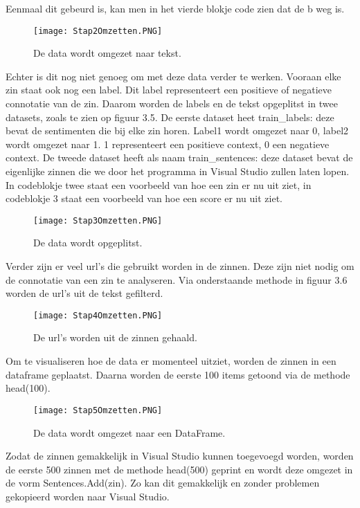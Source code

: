 Eenmaal dit gebeurd is, kan men in het vierde blokje code zien dat de b weg is.

\begin{figure}[!htbp]
    \texttt{[image: Stap2Omzetten.PNG]}
    \caption{\label{stap2amazon}De data wordt omgezet naar tekst.}
\end{figure}
\FloatBarrier

Echter is dit nog niet genoeg om met deze data verder te werken. Vooraan elke zin staat ook nog een label. Dit label representeert een positieve of negatieve connotatie van de zin. Daarom worden de labels en de tekst opgeplitst in twee datasets, zoals te zien op figuur 3.5. De eerste dataset heet train\_labels: deze bevat de sentimenten die bij elke zin horen. Label1 wordt omgezet naar 0, label2 wordt omgezet naar 1. 1 representeert een positieve context, 0 een negatieve context. De tweede dataset heeft als naam train\_sentences: deze dataset bevat de eigenlijke zinnen die we door het programma in Visual Studio zullen laten lopen. In codeblokje twee staat een voorbeeld van hoe een zin er nu uit ziet, in codeblokje 3 staat een voorbeeld van hoe een score er nu uit ziet. 

\begin{figure}[!htbp]
    \texttt{[image: Stap3Omzetten.PNG]}
    \caption{\label{stap3amazon}De data wordt opgeplitst.}
\end{figure}
\FloatBarrier

Verder zijn er veel url's die gebruikt worden in de zinnen. Deze zijn niet nodig om de connotatie van een zin te analyseren. Via onderstaande methode in figuur 3.6 worden de url's uit de tekst gefilterd.

\begin{figure}[!htbp]
    \texttt{[image: Stap4Omzetten.PNG]}
    \caption{\label{stap4amazon}De url's worden uit de zinnen gehaald.}
\end{figure}
\FloatBarrier

Om te visualiseren hoe de data er momenteel uitziet, worden de zinnen in een dataframe geplaatst. Daarna worden de eerste 100 items getoond via de methode head(100).

\begin{figure}[!htbp]
    \texttt{[image: Stap5Omzetten.PNG]}
    \caption{\label{stap5amazon}De data wordt omgezet naar een DataFrame.}
\end{figure}
\FloatBarrier

Zodat de zinnen gemakkelijk in Visual Studio kunnen toegevoegd worden, worden de eerste 500 zinnen met de methode head(500) geprint en wordt deze omgezet in de vorm Sentences.Add(zin). Zo kan dit gemakkelijk en zonder problemen gekopieerd worden naar Visual Studio.

